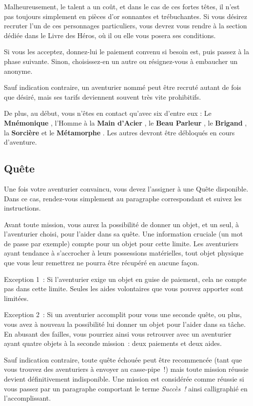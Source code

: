 \documentclass{report}
\newcommand{\success}{
    \emph{Succès !}
}
\newcommand{\hero}[1]{
    \textbf{#1}
}
\begin{document}
Malheureusement, le talent a un coût, et dans le cas de ces fortes têtes, il n'est pas toujours simplement en pièces d'or sonnantes et trébuchantes. Si vous désirez recruter l'un de ces personnages particuliers, vous devrez vous rendre à la section dédiée dans le Livre des Héros, où il ou elle vous posera ses conditions.

Si vous les acceptez, donnez-lui le paiement convenu si besoin est, puis passez à la phase suivante. Sinon, choisissez-en un autre ou résignez-vous à embaucher un anonyme.

Sauf indication contraire, un aventurier nommé peut être recruté autant de fois que désiré, mais ses tarifs deviennent souvent très vite prohibitifs.

De plus, au début, vous n'êtes en contact qu'avec six d'entre eux : Le \hero{Mnémonique}, l’Homme à la \hero{Main d’Acier}, le \hero{Beau Parleur}, le \hero{Brigand}, la \hero{Sorcière} et le \hero{Métamorphe}. Les autres devront être débloqués en cours d'aventure.

\subsection{Quête}

Une fois votre aventurier convaincu, vous devez l'assigner à une Quête disponible. Dans ce cas, rendez-vous simplement au paragraphe correspondant et suivez les instructions.

Avant toute mission, vous aurez la possibilité de donner un objet, et un seul, à l'aventurier choisi, pour l'aider dans sa quête. Une information cruciale (un mot de passe par exemple) compte pour un objet pour cette limite. Les aventuriers ayant tendance à s'accrocher à leurs possessions matérielles, tout objet physique que vous leur remettrez ne pourra être récupéré en aucune façon.

Exception 1 : Si l'aventurier exige un objet en guise de paiement, cela ne compte pas dans cette limite. Seules les aides volontaires que vous pouvez apporter sont limitées.

Exception 2 : Si un aventurier accomplit pour vous une seconde quête, ou plus, vous avez à nouveau la possibilité lui donner un objet pour l'aider dans sa tâche. En abusant des failles, vous pourriez ainsi vous retrouver avec un aventurier ayant quatre objets à la seconde mission : deux paiements et deux aides.

Sauf indication contraire, toute quête échouée peut être recommencée (tant que vous trouvez des aventuriers à envoyer au casse-pipe !) mais toute mission réussie devient définitivement indisponible. Une mission est considérée comme réussie si vous passez par un paragraphe comportant le terme \success ainsi calligraphié en l'accomplissant.
\end{document}
